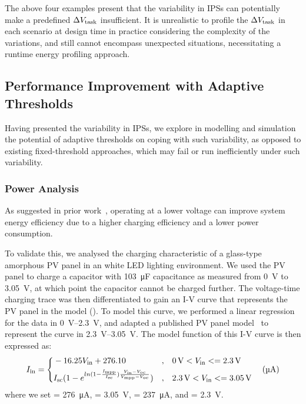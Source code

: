 The above four examples present that the variability in IPSs can potentially make a predefined $\Delta V_{\text{task}}$ insufficient. 
It is unrealistic to profile the $\Delta V_{\text{task}}$ in each scenario at design time in practice considering the complexity of the variations, and still cannot encompass unexpected situations, necessitating a runtime energy profiling approach. 


\subsection{Performance Improvement with Adaptive Thresholds}

Having presented the variability in IPSs, we explore in modelling and simulation the potential of adaptive thresholds on coping with such variability, as opposed to existing fixed-threshold approaches, which may fail or run inefficiently under such variability.


\subsubsection{Power Analysis}

As suggested in prior work~\cite{gomez2016dynamic, pan2017maximize}, operating at a lower voltage can improve system energy efficiency due to a higher charging efficiency and a lower power consumption.

To validate this, we analysed the charging characteristic of a glass-type amorphous PV panel in an white LED lighting environment. 
We used the PV panel to charge a capacitor with \SI{103}{\micro\farad} capacitance as measured from \SI{0}{\volt} to \SI{3.05}{\volt}, at which point the capacitor cannot be charged further. 
The voltage-time charging trace was then differentiated to gain an I-V curve that represents the PV panel in the model (). 
To model this curve, we performed a linear regression for the data in \SIrange{0}{2.3}{\volt}, and adapted a published PV panel model~\cite{en9050326} to represent the curve in \SIrange{2.3}{3.05}{\volt}.
The model function of this I-V curve is then expressed as:
\begin{equation}
    I_{\text{in}} = \left\{
    \begin{aligned}
        & -16.25 V_{\text{in}} + 276.10 & , & \quad \SI{0}{\volt} < V_{\text{in}} <= \SI{2.3}{\volt} \\
        & I_{\text{sc}} (1 - e ^ {ln(1 - \frac{I_{\text{mpp}}}{I_{\text{sc}}}) \frac{V_{\text{in}} - V_{\text{oc}}}{V_{\text{mpp}} - V_{\text{oc}}}}) & , & \quad \SI{2.3}{\volt} < V_{\text{in}} <= \SI{3.05}{\volt}
    \end{aligned}
    \right. 
    \quad (\SI{}{\micro\ampere})
    \label{eq:pv_iv}
\end{equation}
where we set  = \SI{276}{\micro\ampere},  = \SI{3.05}{\volt},  = \SI{237}{\micro\ampere}, and  = \SI{2.3}{\volt}.


